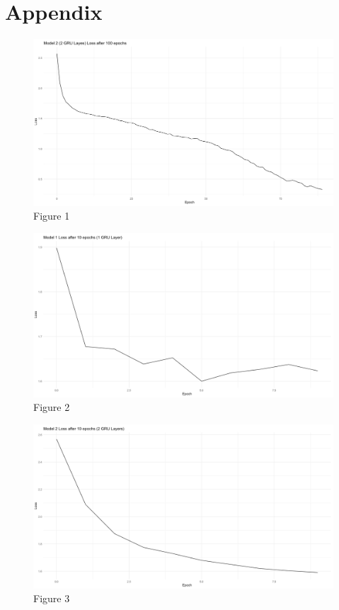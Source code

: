 \documentclass[
]{article}
\begin{document}
\newpage

\section{Appendix}\label{appendix}

\begin{figure}
\centering
\includegraphics{"../Figures/Figure_1.png"}
\caption{Figure 1}
\end{figure}

\begin{figure}
\centering
\includegraphics{"../Figures/Figure_2.png"}
\caption{Figure 2}
\end{figure}

\begin{figure}
\centering
\includegraphics{"../Figures/Figure_3.png"}
\caption{Figure 3}
\end{figure}
\end{document}
